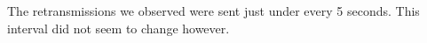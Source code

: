 The retransmissions we observed were sent just under every 5 seconds. This interval did not seem to change however.
